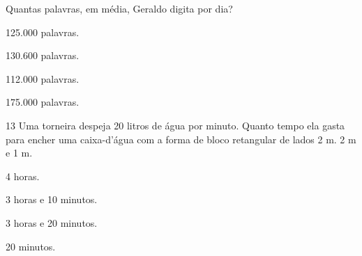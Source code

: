Quantas palavras, em média, Geraldo digita por dia?

\begin{escolha}
\item 125.000 palavras.
\item 130.600 palavras.
\item 112.000 palavras.
\item 175.000 palavras.
\end{escolha}








\num{13} Uma torneira despeja 20 litros de água por minuto. Quanto tempo ela
gasta para encher uma caixa-d'água com a forma de bloco retangular de
lados 2 m. 2 m e 1 m.

\begin{escolha}
\item 4 horas.
\item 3 horas e 10 minutos.
\item 3 horas e 20 minutos.
\item 20 minutos.
\end{escolha}






